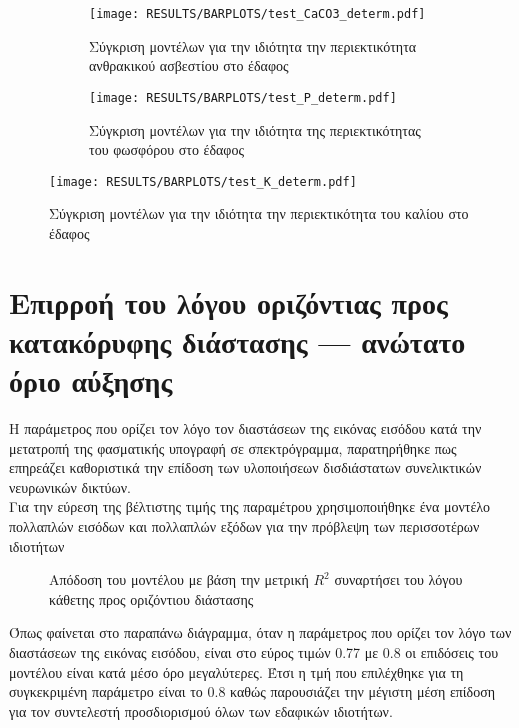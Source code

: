 \begin{figure}[H]
    \begin{subfigure}{0.5\textwidth}
        \texttt{[image: RESULTS/BARPLOTS/test\_CaCO3\_determ.pdf]}
        \caption{Σύγκριση μοντέλων για την ιδιότητα την περιεκτικότητα ανθρακικού ασβεστίου στο έδαφος}
        \label{fig:CaCO3_determ}
    \end{subfigure}
    \begin{subfigure}{0.5\textwidth}
        \texttt{[image: RESULTS/BARPLOTS/test\_P\_determ.pdf]}
        \caption{Σύγκριση μοντέλων για την ιδιότητα της περιεκτικότητας του φωσφόρου στο έδαφος}
        \label{fig:P_determ}
    \end{subfigure}
    \caption{}
\end{figure}
\begin{figure}[H]
    \begin{center}
        \texttt{[image: RESULTS/BARPLOTS/test\_K\_determ.pdf]}
        \caption{Σύγκριση μοντέλων για την ιδιότητα την περιεκτικότητα του καλίου στο έδαφος}
        \label{fig:K_determ}
    \end{center}
\end{figure}

\section{Επιρροή του λόγου οριζόντιας προς κατακόρυφης διάστασης --- ανώτατο όριο αύξησης}
Η παράμετρος που ορίζει τον λόγο τον διαστάσεων της εικόνας εισόδου κατά την μετατροπή της φασματικής υπογραφή σε σπεκτρόγραμμα, παρατηρήθηκε πως επηρεάζει καθοριστικά την επίδοση των υλοποιήσεων δισδιάστατων συνελικτικών νευρωνικών δικτύων.\\
Για την εύρεση της βέλτιστης τιμής της παραμέτρου  χρησιμοποιήθηκε ένα μοντέλο πολλαπλών εισόδων και πολλαπλών εξόδων για την πρόβλεψη των περισσοτέρων ιδιοτήτων

\begin{figure}[H]
  \begin{center}
    
    \caption{Απόδοση του μοντέλου με βάση την μετρική $R^2$ συναρτήσει του λόγου κάθετης προς οριζόντιου διάστασης}
  \end{center}
\end{figure}

Όπως φαίνεται στο παραπάνω διάγραμμα, όταν η παράμετρος που ορίζει τον λόγο των διαστάσεων της εικόνας εισόδου, είναι στο εύρος τιμών 0.77 με 0.8 οι επιδόσεις του μοντέλου είναι κατά μέσο όρο μεγαλύτερες. Έτσι η τμή που επιλέχθηκε για τη συγκεκριμένη παράμετρο είναι το 0.8 καθώς παρουσιάζει την μέγιστη μέση επίδοση για τον συντελεστή προσδιορισμού όλων των εδαφικών ιδιοτήτων.


